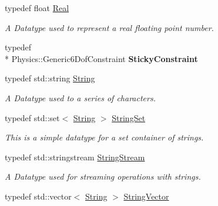 \begin{DoxyCompactItemize}
typedef float \hyperlink{namespaceMezzanine_a726731b1a7df72bf3583e4a97282c6f6}{Real}
\begin{DoxyCompactList}\small\item\em A Datatype used to represent a real floating point number. \end{DoxyCompactList}\item 
\hypertarget{namespaceMezzanine_ac29bbb8cf80a5fe4cfced68bfe448046}{typedef \\*
Physics\-::\-Generic6\-Dof\-Constraint {\bfseries Sticky\-Constraint}}\label{namespaceMezzanine_ac29bbb8cf80a5fe4cfced68bfe448046}

\item 
typedef std\-::string \hyperlink{namespaceMezzanine_acf9fcc130e6ebf08e3d8491aebcf1c86}{String}
\begin{DoxyCompactList}\small\item\em A Datatype used to a series of characters. \end{DoxyCompactList}\item 
\hypertarget{namespaceMezzanine_a1055975ce37fe9d65089bb2db3d2952b}{typedef std\-::set$<$ \hyperlink{namespaceMezzanine_acf9fcc130e6ebf08e3d8491aebcf1c86}{String} $>$ \hyperlink{namespaceMezzanine_a1055975ce37fe9d65089bb2db3d2952b}{String\-Set}}\label{namespaceMezzanine_a1055975ce37fe9d65089bb2db3d2952b}

\begin{DoxyCompactList}\small\item\em This is a simple datatype for a set container of strings. \end{DoxyCompactList}\item 
\hypertarget{namespaceMezzanine_ae5375d2a6e7c5ee59a4459fd735042ac}{typedef std\-::stringstream \hyperlink{namespaceMezzanine_ae5375d2a6e7c5ee59a4459fd735042ac}{String\-Stream}}\label{namespaceMezzanine_ae5375d2a6e7c5ee59a4459fd735042ac}

\begin{DoxyCompactList}\small\item\em A Datatype used for streaming operations with strings. \end{DoxyCompactList}\item 
\hypertarget{namespaceMezzanine_a9b3665ebc21b3444e1d7858d460475f6}{typedef std\-::vector$<$ \hyperlink{namespaceMezzanine_acf9fcc130e6ebf08e3d8491aebcf1c86}{String} $>$ \hyperlink{namespaceMezzanine_a9b3665ebc21b3444e1d7858d460475f6}{String\-Vector}}\label{namespaceMezzanine_a9b3665ebc21b3444e1d7858d460475f6}


\end{DoxyCompactItemize}
